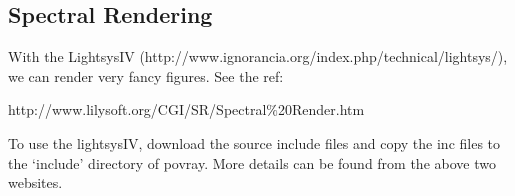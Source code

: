 \documentclass[fleqn,10pt]{wlscirep}
\begin{document}
\subsection{Spectral Rendering}
With the LightsysIV (http://www.ignorancia.org/index.php/technical/lightsys/), we can
render very fancy figures. See the ref:

http://www.lilysoft.org/CGI/SR/Spectral$\%$20Render.htm

To use the lightsysIV, download the source include files and copy the inc files to the `include' directory
of povray. More details can be found from the above two websites.
% 
\end{document}

